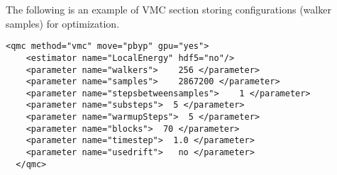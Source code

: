 The following is an example of VMC section storing configurations (walker samples) for optimization.
\begin{lstlisting}[style=XML]
  <qmc method="vmc" move="pbyp" gpu="yes">
    <estimator name="LocalEnergy" hdf5="no"/>
    <parameter name="walkers">    256 </parameter>
    <parameter name="samples">    2867200 </parameter>
    <parameter name="stepsbetweensamples">    1 </parameter>
    <parameter name="substeps">  5 </parameter>
    <parameter name="warmupSteps">  5 </parameter>
    <parameter name="blocks">  70 </parameter>
    <parameter name="timestep">  1.0 </parameter>
    <parameter name="usedrift">   no </parameter>
  </qmc>
\end{lstlisting}



